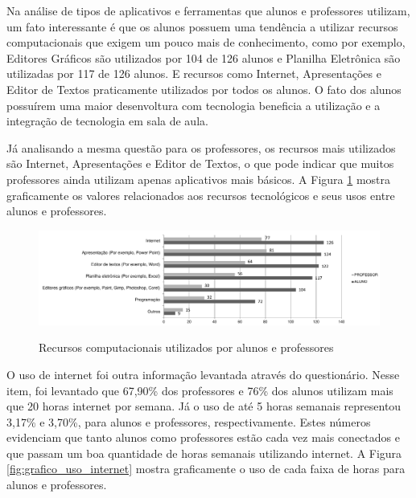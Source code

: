Na análise de tipos de aplicativos e ferramentas que alunos e professores utilizam, um fato interessante é que os alunos possuem uma tendência a utilizar recursos computacionais que exigem um pouco mais de conhecimento, como por exemplo, Editores Gráficos são utilizados por 104 de 126 alunos e Planilha Eletrônica são utilizadas por 117 de 126 alunos. E recursos como Internet, Apresentações e Editor de Textos praticamente utilizados por todos os alunos. O fato dos alunos possuírem uma maior desenvoltura com tecnologia beneficia a utilização e a integração de tecnologia em sala de aula.

Já analisando a mesma questão para os professores, os recursos mais utilizados são Internet, Apresentações e Editor de Textos, o que pode indicar que muitos professores ainda utilizam apenas aplicativos mais básicos. A Figura \ref{fig:grafico_recursos} mostra graficamente os valores relacionados aos recursos tecnológicos e seus usos entre alunos e professores.

\begin{figure}[!h]
\centering
\caption{Recursos computacionais utilizados por alunos e professores}
\includegraphics[width=1.0\textwidth]{pdfs/alunos-professores/recursos-computacionais.pdf} 
\label{fig:grafico_recursos} 
\end{figure}

O uso de internet foi outra informação levantada através do questionário. Nesse item, foi levantado que 67,90\% dos professores e 76\% dos alunos utilizam mais que 20 horas internet por semana. Já o uso de até 5 horas semanais representou 3,17\% e 3,70\%, para alunos e professores, respectivamente. Estes números evidenciam que tanto alunos como professores estão cada vez mais conectados e que passam um boa quantidade de horas semanais utilizando internet. A Figura \ref{fig:grafico_uso_internet} mostra graficamente o uso de cada faixa de horas para alunos e professores.

